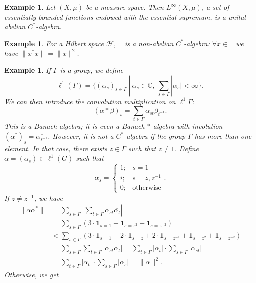 \documentclass[10pt, a4paper]{article}
\newtheorem{example}[thm]{Example}
\newcommand{\C}{\mathbb {C}}
\DeclareMathOperator{\bh}{\mathcal{B} (\mathcal{H})}
\begin{document}
\begin{example}
  Let $(X, \mu)$ be a measure space.
  Then $L^\infty (X, \mu)$, a set of essentially bounded functions endowed with the essential supremum, is a unital abelian $C^*$-algebra.
\end{example}

\begin{example}
  For a Hilbert space $\mathcal{H}$, $\bh$ is a non-abelian $C^*$-algebra:
  $\forall x \in \bh$ we have $\| x^* x\| = \|x\|^2$.
\end{example}

\begin{example}
  If $\Gamma$ is a group, we define 
  $$\ell^1 (\Gamma) = \{(\alpha_s)_{s \in \Gamma}\ |\ \alpha_s \in \C,\ \sum_{s \in \Gamma} |\alpha_s| < \infty\}.$$
  We can then introduce the convolution multiplication on $\ell^1 \Gamma$:
  $$(\alpha * \beta)_s = \sum_{t \in \Gamma} \alpha_{st} \beta_{t^{-1}}.$$
  This is a Banach algebra; it is even a Banach $*$-algebra with involution 
  $(\alpha^*)_s = \overline{\alpha_{s^{-1}}}$. However, it is not a $ C^*$-algebra if the group $\Gamma$ has more than one element. 
  In that case, there exists $z \in \Gamma$ such that $z \neq 1$. Define $\alpha = (\alpha_s) \in \ell^1 (G)$ such that
  $$\alpha_s = \begin{cases}
    1; & s = 1\\
    i; & s = z, z^{-1}\\
    0; &  \textrm{otherwise}
  \end{cases}.$$
  If $z \neq z^{-1}$, we have
  \begin{align*}
    \|\alpha \alpha^*\| &= \sum_{s \in \Gamma} \left| \sum_{t \in \Gamma} \alpha_{st} \overline{\alpha_{t}} \right|\\
    &= \sum_{s \in \Gamma} (3 \cdot \mathbf{1}_{s = 1} + \mathbf{1}_{s = z^2} + \mathbf{1}_{s = z^{-2}})\\
    &< \sum_{s \in \Gamma} (3 \cdot \mathbf{1}_{s = 1} + 2\cdot \mathbf{1}_{s = z} + 2\cdot \mathbf{1}_{s = z^{-1}} + \mathbf{1}_{s = z^2} + \mathbf{1}_{s = z^{-2}})\\
    &= \sum_{s \in \Gamma} \sum_{t \in \Gamma} \left| \alpha_{st} {\alpha_{t}} \right| = \sum_{t \in \Gamma}|{\alpha_{t}}| \cdot \sum_{s \in \Gamma}  \left| \alpha_{st}  \right|\\
    &= \sum_{t \in \Gamma} \left|  {\alpha_{t}} \right| \cdot \sum_{s \in \Gamma} |\alpha_{s}| = \| \alpha\|^2.
  \end{align*}
  Otherwise, we get 
  \begin{align*}

\end{align*}
\end{example}
\end{document}

